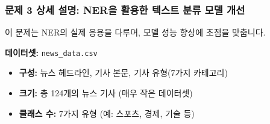 \documentclass[11pt,a4paper]{article}
\theoremstyle{definition}
\begin{document}
\subsubsection*{문제 3 상세 설명: NER을 활용한 텍스트 분류 모델 개선}
이 문제는 NER의 실제 응용을 다루며, 모델 성능 향상에 초점을 맞춥니다.

\textbf{데이터셋:} \texttt{news\_data.csv}
\begin{itemize}
    \item \textbf{구성:} 뉴스 헤드라인, 기사 본문, 기사 유형(7가지 카테고리)
    \item \textbf{크기:} 총 124개의 뉴스 기사 (매우 작은 데이터셋)
    \item \textbf{클래스 수:} 7가지 유형 (예: 스포츠, 경제, 기술 등)
\end{itemize}
\end{document}

